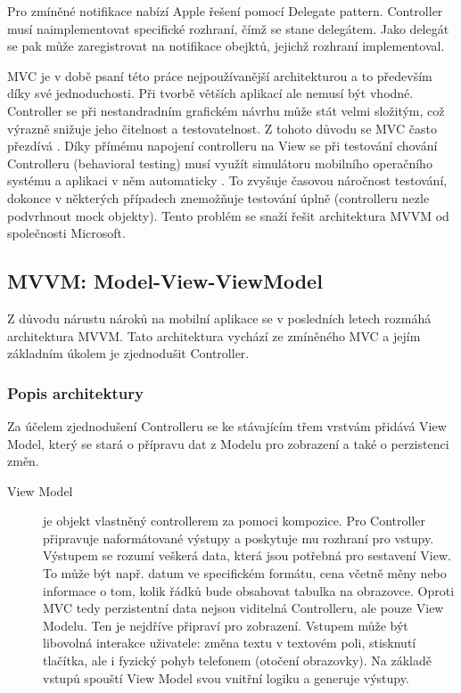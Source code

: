 
Pro zmíněné notifikace nabízí Apple řešení pomocí Delegate pattern.
Controller musí naimplementovat specifické rozhraní, čímž se stane delegátem.
Jako delegát se pak může zaregistrovat na notifikace obejktů, jejichž rozhraní implementoval.

MVC je v době psaní této práce nejpoužívanější architekturou a to především díky své jednoduchosti.
Při tvorbě větších aplikací ale nemusí být vhodné.
Controller se při nestandradním grafickém návrhu může stát velmi složitým, což výrazně snižuje jeho čitelnost a testovatelnost.
Z tohoto důvodu se MVC často přezdívá .
Díky přímému napojení controlleru na View se při testování chování Controlleru (behavioral testing) musí využít simulátoru mobilního operačního systému a aplikaci v něm automaticky .
To zvyšuje časovou náročnost testování, dokonce v některých případech znemožňuje testování úplně (controlleru nezle podvrhnout mock objekty).
Tento problém se snaží řešit architektura MVVM od společnosti Microsoft.

\subsection{MVVM: Model-View-ViewModel}\label{analyza-mvvm}

Z důvodu nárustu nároků na mobilní aplikace se v posledních letech rozmáhá architektura MVVM.
Tato architektura vychází ze zmíněného MVC a jejím základním úkolem je zjednodušit Controller.

\subsubsection{Popis architektury} \label{architektura-mvvm-popis}

Za účelem zjednodušení Controlleru se ke stávajícím třem vrstvám přidává View Model, který se stará o přípravu dat z Modelu pro zobrazení a také o perzistenci změn.

\begin{description}
  \item[View Model] je objekt vlastněný controllerem za pomoci kompozice.
  Pro Controller připravuje naformátované výstupy a poskytuje mu rozhraní pro vstupy.
  Výstupem se rozumí veškerá data, která jsou potřebná pro sestavení View.
  To může být např. datum ve specifickém formátu, cena včetně měny nebo informace o tom, kolik řádků bude obsahovat tabulka na obrazovce.
  Oproti MVC tedy perzistentní data nejsou viditelná Controlleru, ale pouze View Modelu.
  Ten je nejdříve připraví pro zobrazení.
  Vstupem může být libovolná interakce uživatele:
  změna textu v textovém poli, stisknutí tlačítka, ale i fyzický pohyb telefonem (otočení obrazovky).
  Na základě vstupů spouští View Model svou vnitřní logiku a generuje výstupy.
\end{description}

